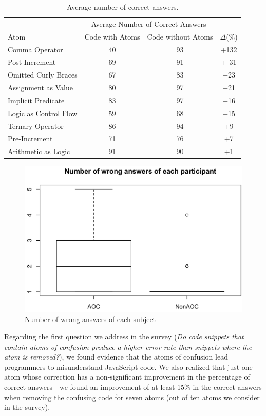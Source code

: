 \begin{table}[htbp]
\caption{Average number of correct answers.}
\label{tab:difference-correctness}
\begin{tabular}{lccc} \toprule
 & \multicolumn{2}{c}{Average Number of Correct Answers} & \\ [0.1cm]
 Atom & Code with Atoms & Code without Atoms & $\Delta$(\%) \\ \midrule 
 Comma Operator          & 40 & 93  & +132 \\
 Post Increment          & 69 & 91  & + 31  \\
 Omitted Curly Braces    & 67 & 83  & +23 \\
 Assignment as Value     & 80 & 97  & +21 \\
 Implicit Predicate      & 83 & 97  & +16 \\
 Logic as Control Flow   & 59 & 68  & +15 \\
 Ternary Operator        & 86 & 94  & +9  \\
 Pre-Increment           & 71 & 76  & +7  \\
 Arithmetic as Logic     & 91 & 90  & +1  \\ \bottomrule
\end{tabular}
\end{table}


\begin{figure}[htb!]
\noindent
 \centering
 \includegraphics[scale=.20]{images/wrong.png}
 \caption{Number of wrong answers of each subject}
 \label{fig:boxplotcorrectness}
 \end{figure}

Regarding the first question we 
address in the survey (\emph{Do code snippets that contain atoms of confusion produce a higher error rate than snippets where the atom is removed?}), we found evidence that the atoms of confusion lead programmers to misunderstand JavaScript code. We also realized that just one atom whose correction has a non-significant improvement in the percentage of correct answers---we found an improvement of at least 15\% in the correct answers when removing the confusing code for seven atoms (out of ten atoms we consider in the survey). 

